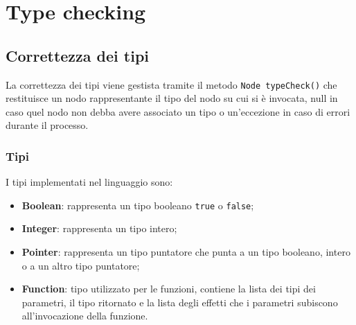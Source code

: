 \documentclass[../main.tex]{subfiles}
\begin{document}
\chapter{Type checking}\label{c:typechecking}
\section{Correttezza dei tipi}
La correttezza dei tipi viene gestista tramite il metodo \verb|Node typeCheck()| che restituisce un nodo rappresentante il tipo del nodo su cui si \`e invocata, null in caso quel nodo non debba avere associato un tipo o  un'eccezione in caso di errori durante il processo.
\subsection{Tipi}
I tipi implementati nel linguaggio sono:
\begin{itemize}
    \item \textbf{Boolean}: rappresenta un tipo booleano \verb|true| o \verb|false|;
    \item \textbf{Integer}: rappresenta un tipo intero;
    \item \textbf{Pointer}: rappresenta un tipo puntatore che punta a un tipo booleano, intero o a un altro tipo puntatore;
    \item \textbf{Function}: tipo utilizzato per le funzioni, contiene la lista dei tipi dei parametri, il tipo ritornato e la lista degli effetti che i parametri subiscono all'invocazione della funzione.
\end{itemize}
\end{document}
